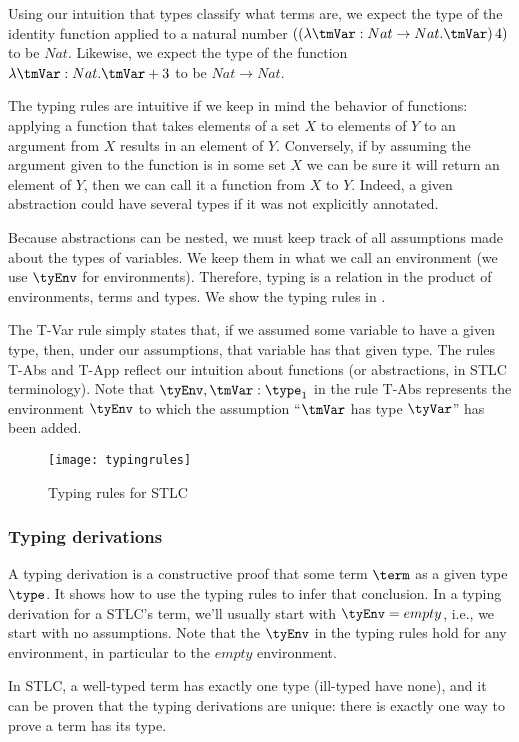 Using our intuition that types classify what terms are, we expect the type of the identity function applied to a natural number $((\lambda \tmVar: Nat \rightarrow Nat. \tmVar) \, 4)$ to be $Nat$. Likewise, we expect the type of the function $\lambda \tmVar:Nat.\tmVar+3$ to be $Nat \rightarrow Nat$.

The typing rules are intuitive if we keep in mind the behavior of functions: applying a function that takes elements of a set $X$ to elements of $Y$ to an argument from $X$ results in an element of $Y$. Conversely, if by assuming the argument given to the function is in some set $X$ we can be sure it will return an element of $Y$, then we can call it a function from $X$ to $Y$. Indeed, a given abstraction could have several types if it was not explicitly annotated.

Because abstractions can be nested, we must keep track of all assumptions made about the types of variables. We keep them in what we call an environment (we use $\tyEnv$ for environments). Therefore, typing is a relation in the product of environments, terms and types. We show the typing rules in .

The T-Var rule simply states that, if we assumed some variable to have a given type, then, under our assumptions, that variable has that given type. The rules T-Abs and T-App reflect our intuition about functions (or abstractions, in STLC terminology). Note that $\tyEnv,\tmVar:\type_1$ in the rule T-Abs represents the environment $\tyEnv$ to which the assumption ``$\tmVar$ has type $\tyVar$'' has been added.

\begin{figure}
  \centering
  \texttt{[image: typingrules]}
  \caption{Typing rules for STLC}
  \label{STLC typing}
\end{figure}
\subsubsection{Typing derivations}
A typing derivation is a constructive proof that some term $\term$ as a given type $\type$. It shows how to use the typing rules to infer that conclusion. In a typing derivation for a STLC's term, we'll usually start with $\tyEnv=empty$, i.e., we start with no assumptions. Note that the $\tyEnv$ in the typing rules hold for any environment, in particular to the $empty$ environment.

In STLC, a well-typed term has exactly one type (ill-typed have none), and it can be proven that the typing derivations are unique: there is exactly one way to prove a term has its type.

